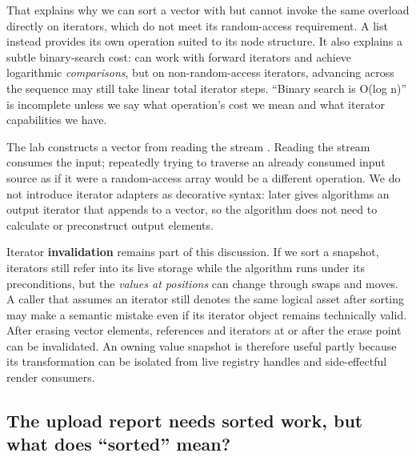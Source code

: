That explains why we can sort a vector with  but cannot invoke the same overload directly on  iterators, which do not meet its random-access requirement. A list instead provides its own  operation suited to its node structure. It also explains a subtle binary-search cost:  can work with forward iterators and achieve logarithmic \emph{comparisons}, but on non-random-access iterators, advancing across the sequence may still take linear total iterator steps. ``Binary search is O(log n)'' is incomplete unless we say what operation's cost we mean and what iterator capabilities we have.

The lab constructs a vector from  reading the stream . Reading the stream consumes the input; repeatedly trying to traverse an already consumed input source as if it were a random-access array would be a different operation. We do not introduce iterator adapters as decorative syntax:  later gives algorithms an output iterator that appends to a vector, so the algorithm does not need to calculate or preconstruct output elements.

Iterator \textbf{invalidation} remains part of this discussion. If we sort a snapshot, iterators still refer into its live storage while the algorithm runs under its preconditions, but the \emph{values at positions} can change through swaps and moves. A caller that assumes an iterator still denotes the same logical asset after sorting may make a semantic mistake even if its iterator object remains technically valid. After erasing vector elements, references and iterators at or after the erase point can be invalidated. An owning value snapshot is therefore useful partly because its transformation can be isolated from live registry handles and side-effectful render consumers.

\subsection{The upload report needs sorted work, but what does ``sorted'' mean?}\label{01-foundations-i-ch006-the-upload-report-needs-sorted-work-but-what-does-sorted-mean}

